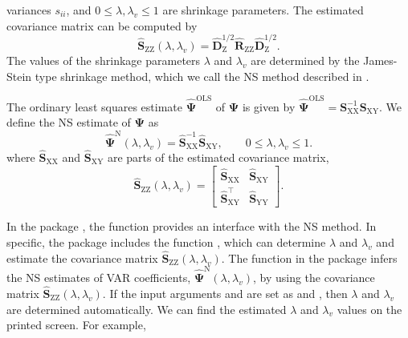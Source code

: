 \documentclass[
]{jss}
\begin{document}
variances \(s_{ii}\), and \(0\leq \lambda, \lambda_v \leq 1\) are
shrinkage parameters. The estimated covariance matrix can be computed by
\begin{equation}
    \widehat{\mathbf{S}}_\text{ZZ}(\lambda, \lambda_v)
    =  \widehat{\mathbf{D}}_\text{Z}^{1/2}
    \widehat{\mathbf{R}}_\text{ZZ}
    \widehat{\mathbf{D}}_\text{Z}^{1/2}.
    \end{equation} The values of the shrinkage parameters \(\lambda\)
and \(\lambda_v\) are determined by the James-Stein type shrinkage
method, which we call the NS method described in
\citep{Rhein07a, Schafer05b}.

The ordinary least squares estimate
\(\widehat{\mathbf{\Psi}}^{\text{OLS}}\) of \(\mathbf{\Psi}\) is given
by
\(\widehat{\mathbf{\Psi}}^{\text{OLS}} = \mathbf{S}_\text{XX}^{-1} \mathbf{S}_\text{XY}\).
We define the NS estimate of \(\mathbf{\Psi}\) as \begin{equation}
    \widehat{ \mathbf{\Psi} }^\text{N} (\lambda, \lambda_v) =
    \widehat{\mathbf{S}}_\text{XX}^{-1}
    \widehat{\mathbf{S}}_\text{XY},
    \qquad
    0\leq \lambda, \lambda_v \leq 1.
    \end{equation} where \(\widehat{\mathbf{S}}_\text{XX}\) and
\(\widehat{\mathbf{S}}_\text{XY}\) are parts of the estimated covariance
matrix, \begin{equation}
    \widehat{\mathbf{S}}_\text{ZZ} (\lambda, \lambda_v) =
    \begin{bmatrix} \widehat{\mathbf{S}}_\text{XX} & \widehat{\mathbf{S}}_\text{XY} \\
    \widehat{\mathbf{S}}_\text{XY}^\top & \widehat{\mathbf{S}}_\text{YY}
    \end{bmatrix}.
    \end{equation}

In the package , the function
 provides an interface with the
NS method. In specific, the package  \citep{Schafer17}
includes the  function , which can
determine \(\lambda\) and \(\lambda_v\) and estimate the covariance
matrix \(\widehat{\mathbf{S}}_\text{ZZ}(\lambda, \lambda_v)\). The
function  in the  package infers the NS
estimates of VAR coefficients,
\(\widehat{\mathbf{\Psi}}^\text{N} (\lambda, \lambda_v)\), by using the
covariance matrix
\(\widehat{\mathbf{S}}_\text{ZZ}(\lambda, \lambda_v)\). If the input
arguments  and  are set as
 and , then \(\lambda\) and
\(\lambda_v\) are determined automatically. We can find the estimated
\(\lambda\) and \(\lambda_v\) values on the printed screen. For example,
\end{document}
